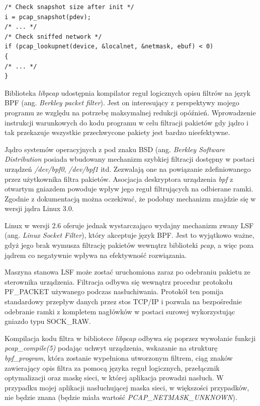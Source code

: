 \begin{lstlisting}[frame=tb]
/* Check snapshot size after init */
i = pcap_snapshot(pdev);
/* ... */
/* Check sniffed network */
if (pcap_lookupnet(device, &localnet, &netmask, ebuf) < 0) 
{
/* ... */
}
\end{lstlisting}

Biblioteka \emph{libpcap} udostępnia kompilator reguł logicznych opisu filtrów na język BPF (ang. \emph{Berkley packet filter}). Jest on interesujący z perspektywy mojego programu ze względu na potrzebę maksymalnej redukcji opóźnień. Wprowadzenie instrukcji warunkowych do kodu programu w celu filtracji pakietów gdy jądro i tak przekazuje wszystkie przechwycone pakiety jest bardzo nieefektywne. 

Jądro systemów operacyjnych z pod znaku BSD (ang. \emph{Berkley Software Distribution} posiada wbudowany mechanizm szybkiej filtracji dostępny w postaci urządzeń \emph{/dev/bpf0}, \emph{/dev/bpf1} itd.  Zezwalają one na powiązanie zdefiniowanego przez użytkownika filtra pakietów. Asocjacja deskryptora urządzenia \emph{bpf} z otwartym gniazdem powoduje wpływ jego reguł filtrujących na odbierane ramki. Zgodnie z dokumentacją można oczekiwać, że podobny mechanizm znajdzie się w wersji jądra Linux 3.0.

Linux w wersji 2.6 oferuje jednak wystarczająco wydajny mechanizm zwany LSF (ang. \emph{Linux Socket Filter}), który akceptuje język BPF. Jest to wyjątkowo ważne, gdyż jego brak wymusza filtrację pakietów wewnątrz biblioteki \emph{pcap}, a więc poza jądrem co negatywnie wpływa na efektywność rozwiązania.

Maszyna stanowa LSF może zostać uruchomiona zaraz po odebraniu pakietu ze sterownika urządzenia. Filtracja odbywa się wewnątrz procedur protokołu PF\_PACKET używanego podczas nasłuchiwania. Protokół ten pomija standardowy przepływ danych przez stos TCP/IP i pozwala na bezpośrednie odebranie ramki z kompletem nagłówków w postaci surowej wykorzystując gniazdo typu SOCK\_RAW. 

Kompilacja kodu filtra w bibliotece \emph{libpcap} odbywa się poprzez wywołanie funkcji \emph{pcap\_compile(5)} podając uchwyt urządzenia, wskazanie na strukturę \emph{bpf\_program}, która zostanie wypełniona utworzonym filtrem, ciąg znaków zawierający opis filtra za pomocą języka reguł logicznych, przełącznik optymalizacji oraz maskę sieci, w której aplikacja prowadzi nasłuch. W przypadku mojej aplikacji nasłuchującej maska sieci, w większości przypadków, nie będzie znana (będzie miała wartość \emph{PCAP\_NETMASK\_UNKNOWN}).

